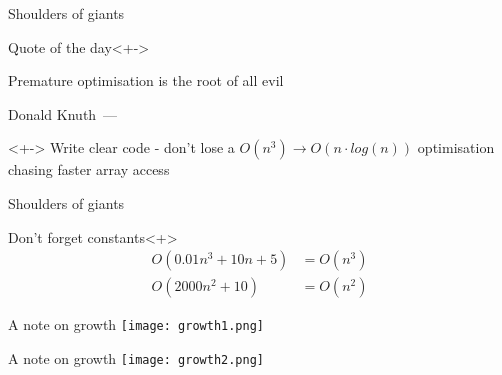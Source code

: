 \documentclass[pdf]{beamer}
\begin{document}
\let\oldquote\quote
\let\endoldquote\endquote
\renewenvironment{quote}[2][]{

    \if\relax\detokenize{#1}\relax
       \def\quoteauthor{#2}%
    \else
        \def\quoteauthor{#2~---~#1}%
    \fi

    \oldquote
}{
    \par\nobreak\smallskip\hfill\quoteauthor%
    \endoldquote\addvspace{\bigskipamount}
}

\begin{frame}{Shoulders of giants}
    \begin{block}{Quote of the day}<+->
        \begin{quote}{Donald Knuth}
            Premature optimisation is the root of all evil
        \end{quote}
    \end{block}

    \begin{block}{}<+->
        Write clear code - don't lose a $O(n^{3}) \rightarrow O(n \cdot
        log(n))$ optimisation chasing faster array access
    \end{block}
\end{frame}

\begin{frame}{Shoulders of giants}
    \begin{block}{Don't forget constants}<+>
        \begin{align*}
            O(0.01 n^{3} + 10 n + 5) &= O(n^{3}) \\
            O(2000 n^{2} + 10)       &= O(n^{2})
        \end{align*}
    \end{block}
\end{frame}

\begin{frame}{A note on growth}
    \texttt{[image: growth1.png]}
\end{frame}

\begin{frame}{A note on growth}
    \texttt{[image: growth2.png]}
\end{frame}
\end{document}
